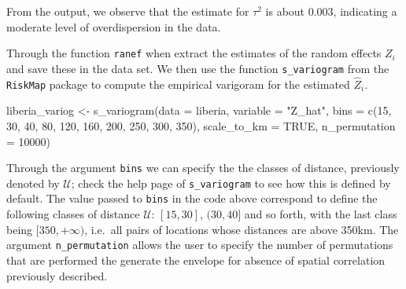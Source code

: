 \documentclass[
  letterpaper,
]{krantz}
\newenvironment{Shaded}{\begin{snugshade}}{\end{snugshade}}
\newcommand{\AttributeTok}[1]{\textcolor[rgb]{0.40,0.45,0.13}{#1}}
\newcommand{\ConstantTok}[1]{\textcolor[rgb]{0.56,0.35,0.01}{#1}}
\newcommand{\DecValTok}[1]{\textcolor[rgb]{0.68,0.00,0.00}{#1}}
\newcommand{\FunctionTok}[1]{\textcolor[rgb]{0.28,0.35,0.67}{#1}}
\newcommand{\NormalTok}[1]{\textcolor[rgb]{0.00,0.23,0.31}{#1}}
\newcommand{\OtherTok}[1]{\textcolor[rgb]{0.00,0.23,0.31}{#1}}
\newcommand{\SpecialCharTok}[1]{\textcolor[rgb]{0.37,0.37,0.37}{#1}}
\newcommand{\StringTok}[1]{\textcolor[rgb]{0.13,0.47,0.30}{#1}}
\begin{document}
From the output, we observe that the estimate for \(\tau^2\) is about
0.003, indicating a moderate level of overdispersion in the data.

\begin{Shaded}
\end{Shaded}

Through the function \texttt{ranef} when extract the estimates of the
random effects \(Z_i\) and save these in the data set. We then use the
function \texttt{s\_variogram} from the \texttt{RiskMap} package to
compute the empirical varigoram for the estimated \(\hat{Z}_i\).

\begin{Shaded}
\begin{Highlighting}[]
\NormalTok{liberia\_variog }\OtherTok{\textless{}{-}} \FunctionTok{s\_variogram}\NormalTok{(}\AttributeTok{data =}\NormalTok{ liberia,}
                              \AttributeTok{variable =} \StringTok{"Z\_hat"}\NormalTok{,}
                              \AttributeTok{bins =} \FunctionTok{c}\NormalTok{(}\DecValTok{15}\NormalTok{, }\DecValTok{30}\NormalTok{, }\DecValTok{40}\NormalTok{, }\DecValTok{80}\NormalTok{, }\DecValTok{120}\NormalTok{,}
                                       \DecValTok{160}\NormalTok{, }\DecValTok{200}\NormalTok{, }\DecValTok{250}\NormalTok{, }\DecValTok{300}\NormalTok{, }\DecValTok{350}\NormalTok{),}
                              \AttributeTok{scale\_to\_km =} \ConstantTok{TRUE}\NormalTok{,}
                              \AttributeTok{n\_permutation =} \DecValTok{10000}\NormalTok{)}
\end{Highlighting}
\end{Shaded}

Through the argument \texttt{bins} we can specify the the classes of
distance, previously denoted by \(\mathcal{U}\); check the help page of
\texttt{s\_variogram} to see how this is defined by default. The value
passed to \texttt{bins} in the code above correspond to define the
following classes of distance \(\mathcal{U}\): \([15, 30]\),
\((30, 40]\) and so forth, with the last class being \([350, +\infty)\),
i.e.~all pairs of locations whose distances are above 350km. The
argument \texttt{n\_permutation} allows the user to specify the number
of permutations that are performed the generate the envelope for absence
of spatial correlation previously described.
\end{document}

